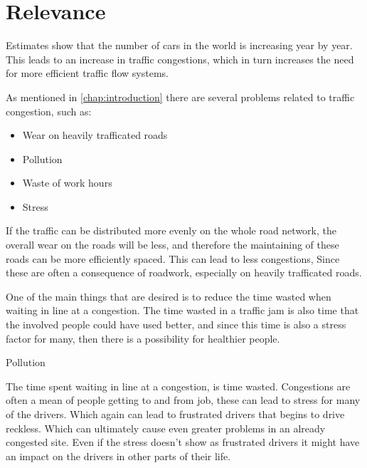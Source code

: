 \section{Relevance}
Estimates show that the number of cars in the world is increasing year by year. This leads to an increase in traffic congestions, which in turn increases the need for more efficient traffic flow systems.

As mentioned in \ref{chap:introduction} there are several problems related to traffic congestion, such as:
\begin{itemize}
	\item Wear on heavily trafficated roads
	\item Pollution
	\item Waste of work hours
	\item Stress
\end{itemize}

If the traffic can be distributed more evenly on the whole road network, the overall wear on the roads will be less, and therefore the maintaining of these roads can be more efficiently spaced. This can lead to less congestions, Since these are often a consequence of roadwork, especially on heavily trafficated roads.

One of the main things that are desired is to reduce the time wasted when waiting in line at a congestion.
The time wasted in a traffic jam is also time that the involved people could have used better, and since this time is also a stress factor for many, then there is a possibility for healthier people.

Pollution

The time spent waiting in line at a congestion, is time wasted. Congestions are often a mean of people getting to and from job, these can lead to stress for many of the drivers. Which again can lead to frustrated drivers that begins to drive reckless. Which can ultimately cause even greater problems in an already congested site. Even if the stress doesn't show as frustrated drivers it might have an impact on the drivers in other parts of their life.